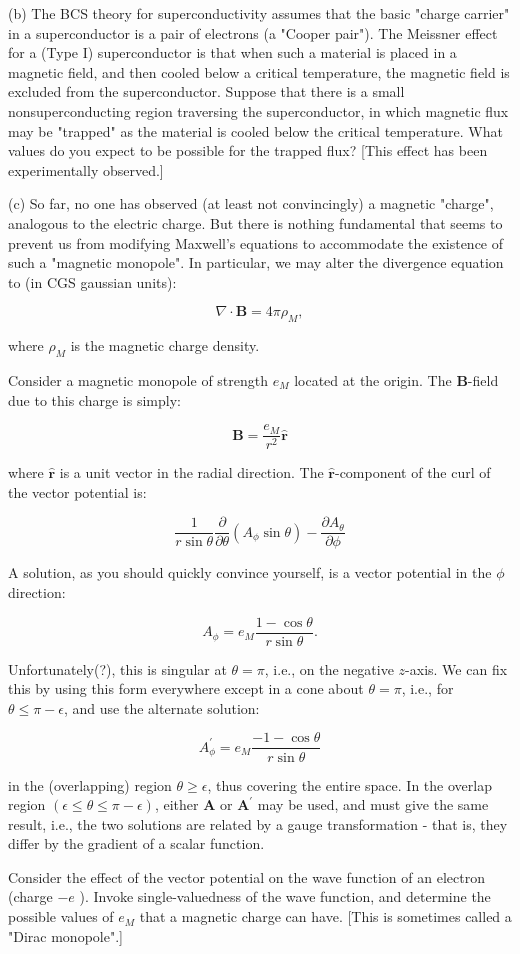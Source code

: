 \documentclass[12pt]{article}
\begin{document}
(b) The BCS theory for superconductivity assumes that the basic "charge carrier" in a superconductor is a pair of electrons (a "Cooper pair"). The Meissner effect for a (Type I) superconductor is that when such a material is placed in a magnetic field, and then cooled below a critical temperature, the magnetic field is excluded from the superconductor. Suppose that there is a small nonsuperconducting region traversing the superconductor, in which magnetic flux may be "trapped" as the material is cooled below the critical temperature. What values do you expect to be possible for the trapped flux? [This effect has been experimentally observed.]

(c) So far, no one has observed (at least not convincingly) a magnetic "charge", analogous to the electric charge. But there is nothing fundamental that seems to prevent us from modifying Maxwell's equations to accommodate the existence of such a "magnetic monopole". In particular, we may alter the divergence equation to (in CGS gaussian units):

$$
\nabla \cdot \boldsymbol{B}=4 \pi \rho_{M},
$$

where $\rho_{M}$ is the magnetic charge density.

Consider a magnetic monopole of strength $e_{M}$ located at the origin. The $\boldsymbol{B}$-field due to this charge is simply:

$$
\boldsymbol{B}=\frac{e_{M}}{r^{2}} \hat{\boldsymbol{r}}
$$

where $\hat{\boldsymbol{r}}$ is a unit vector in the radial direction. The $\hat{\boldsymbol{r}}$-component of the curl of the vector potential is:

$$
\frac{1}{r \sin \theta} \frac{\partial}{\partial \theta}\left(A_{\phi} \sin \theta\right)-\frac{\partial A_{\theta}}{\partial \phi}
$$

A solution, as you should quickly convince yourself, is a vector potential in the $\phi$ direction:

$$
A_{\phi}=e_{M} \frac{1-\cos \theta}{r \sin \theta} .
$$

Unfortunately(?), this is singular at $\theta=\pi$, i.e., on the negative $z$-axis. We can fix this by using this form everywhere except in a cone about $\theta=\pi$, i.e., for $\theta \leq \pi-\epsilon$, and use the alternate solution:

$$
A_{\phi}^{\prime}=e_{M} \frac{-1-\cos \theta}{r \sin \theta}
$$

in the (overlapping) region $\theta \geq \epsilon$, thus covering the entire space. In the overlap region $(\epsilon \leq \theta \leq \pi-\epsilon)$, either $\boldsymbol{A}$ or $\boldsymbol{A}^{\prime}$ may be used, and must give the same result, i.e., the two solutions are related by a gauge transformation - that is, they differ by the gradient of a scalar function.

Consider the effect of the vector potential on the wave function of an electron (charge $-e$ ). Invoke single-valuedness of the wave function, and determine the possible values of $e_{M}$ that a magnetic charge can have. [This is sometimes called a "Dirac monopole".]
\end{document}
